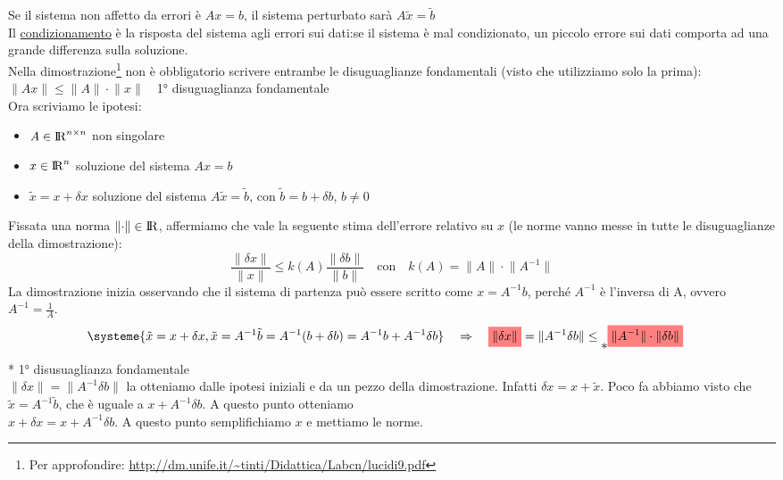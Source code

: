 Se il sistema non affetto da errori è $Ax=b$, il sistema perturbato sarà $A\tilde{x}=\tilde{b}$\\
Il \underline{condizionamento} è la risposta del sistema agli errori sui dati:se il sistema è mal condizionato, un piccolo errore sui dati comporta ad una grande differenza sulla soluzione.\\
Nella dimostrazione\footnote[3]{Per approfondire: \url{http://dm.unife.it/~tinti/Didattica/Labcn/lucidi9.pdf}} non è obbligatorio scrivere entrambe le disuguaglianze fondamentali (visto che utilizziamo solo la prima):\\
$\lVert Ax \rVert \leq \lVert A \rVert \cdot \lVert x \rVert \quad $1° disuguaglianza fondamentale\\
Ora scriviamo le ipotesi:
\begin{itemize}
    \item $A \in {\rm I\!R}^{n\times n}$ non singolare
    \item $x \in {\rm I\!R}^n$ soluzione del sistema $Ax=b$
    \item $\tilde{x}=x+\delta x$ soluzione del sistema $A\tilde{x}=\tilde{b}$, con $\tilde{b}=b+\delta b$, $b \neq 0$
\end{itemize}
Fissata una norma $\lVert \cdot \rVert \in {\rm I\!R}$, affermiamo che vale la seguente stima dell'errore relativo su $x$ (le norme vanno messe in tutte le disuguaglianze della dimostrazione):\\
\begin{displaymath}
    \frac{\lVert \delta x \rVert}{\lVert x \rVert} \leq k(A)\frac{\lVert \delta b \rVert}{\lVert b\rVert} \quad \text{con} \quad k(A)=\lVert A \rVert \cdot \lVert A^{-1}\rVert
\end{displaymath}
La dimostrazione inizia osservando che il sistema di partenza può essere scritto come $x=A^{-1}b$, perché $A^{-1}$ è l'inversa di A, ovvero $A^{-1}=\frac{1}{A}$.
\begin{align*}
    &\systeme{\tilde{x} = x+\delta x, \tilde{x} = A^{-1}\tilde{b}=A^{-1}(b+\delta b) = A^{-1}b + A^{-1}\delta b}  \quad \Rightarrow \quad \highlightRED{\lVert \delta x \rVert} = \lVert A^{-1}\delta b \rVert \leq \raisebox{-10pt}{*} \highlightRED{\lVert A^{-1} \rVert \cdot \lVert \delta b \rVert}
\end{align*}
* 1° disusuaglianza fondamentale\\
$\lVert \delta x \rVert = \lVert A^{-1}\delta b \rVert$ la otteniamo dalle ipotesi iniziali e da un pezzo della dimostrazione. Infatti $\delta x=x+\tilde{x}$. Poco fa abbiamo visto che $\tilde{x}=A^{-1}\tilde{b}$, che è uguale a $x+A^{-1}\delta b$. A questo punto otteniamo\\ $x+\delta x=x+A^{-1}\delta b$. A questo punto semplifichiamo $x$ e mettiamo le norme.\\
